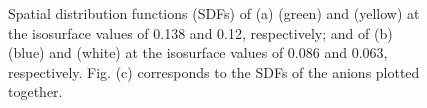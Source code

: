 \documentclass[3p,twocolumn]{elsarticle}
\begin{document}
\begin{figure}
\centering
{}
\caption{Spatial distribution functions (SDFs) of (a) \ce{[B(CN)_4]^-} (green) and \ce{[emim]^+} (yellow) at the isosurface values of 0.138 and 0.12, respectively; and of (b) \ce{[NTf_2]^-} (blue) and \ce{[emim]^+} (white) at the isosurface values of 0.086 and 0.063, respectively.
Fig. (c) corresponds to the SDFs of the anions plotted together.}
\label{fig:sdf_ions}
\end{figure}
\end{document}
